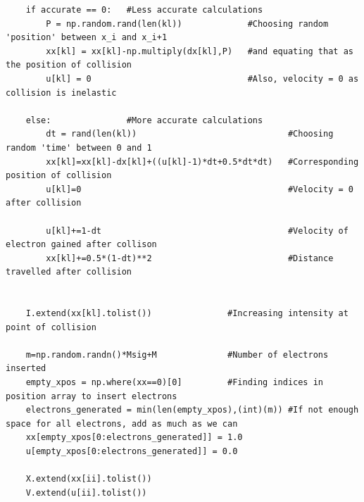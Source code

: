 \documentclass[11pt, a4paper]{article}
\begin{document}
\begin{lstlisting}
    if accurate == 0:   #Less accurate calculations
        P = np.random.rand(len(kl))             #Choosing random 'position' between x_i and x_i+1
        xx[kl] = xx[kl]-np.multiply(dx[kl],P)   #and equating that as the position of collision
        u[kl] = 0                               #Also, velocity = 0 as collision is inelastic

    else:               #More accurate calculations
        dt = rand(len(kl))                              #Choosing random 'time' between 0 and 1
        xx[kl]=xx[kl]-dx[kl]+((u[kl]-1)*dt+0.5*dt*dt)   #Corresponding position of collision
        u[kl]=0                                         #Velocity = 0 after collision

        u[kl]+=1-dt                                     #Velocity of electron gained after collison
        xx[kl]+=0.5*(1-dt)**2                           #Distance travelled after collision

    
    I.extend(xx[kl].tolist())               #Increasing intensity at point of collision
    
    m=np.random.randn()*Msig+M              #Number of electrons inserted
    empty_xpos = np.where(xx==0)[0]         #Finding indices in position array to insert electrons
    electrons_generated = min(len(empty_xpos),(int)(m)) #If not enough space for all electrons, add as much as we can
    xx[empty_xpos[0:electrons_generated]] = 1.0
    u[empty_xpos[0:electrons_generated]] = 0.0
    
    X.extend(xx[ii].tolist())
    V.extend(u[ii].tolist())
\end{lstlisting}
\end{document}
